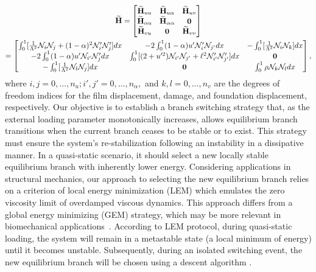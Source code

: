 \begin{multline}
    \widetilde{\mathbf{H}}=
    \begin{bmatrix}
        \widetilde{\mathbf{H}}_{uu}       & \widetilde{\mathbf{H}}_{u\alpha}      & \widetilde{\mathbf{H}}_{uv} \\
        \widetilde{\mathbf{H}}_{\alpha u} & \widetilde{\mathbf{H}}_{\alpha\alpha} & \textbf{0}          \\
        \widetilde{\mathbf{H}}_{vu}       & \textbf{0}                    & \widetilde{\mathbf{H}}_{vv}
    \end{bmatrix}
    \\=
    \begin{bmatrix}
        \int_0^1[ \frac{1}{\Lambda^2}{\mathcal N}_i{\mathcal N}_j + (1-\alpha)^2{\mathcal N}'_i{\mathcal N}'_j] dx         &
        -2\int_0^1(1-\alpha)u' {\mathcal N}'_i {\mathcal N}_{{j'}}  dx                                                     &
        -\int_0^1[\frac{1}{\Lambda^2}{\mathcal N}_i {\mathcal N}_{{k}}]  dx                                                                                                                     \\
        -2\int_0^1(1-\alpha)u' {\mathcal N}_{{i'}} {\mathcal N}'_j dx                                                      &
        \int_0^1 [ (2+u'^2){\mathcal N}_{{i'}}{\mathcal N}_{{j'}} +\ell^2{\mathcal N}'_{{i'}}{\mathcal N}'_{{j'}}] dx &
        \textbf{0}                                                                                                                                                                              \\
        -\int_0^1[\frac{1}{\Lambda^2}{\mathcal N}_{{l}}{\mathcal N}_j ] dx                                                 & \textbf{0} & \int_0^1 \rho {\mathcal N}_{{k}}{\mathcal N}_{{l}} dx
    \end{bmatrix},
    \label{eq:stifness2}
\end{multline}
{where $i, j = 0,\dots, n_u; i', j' = 0,\dots, n_\alpha, $ and $k, l = 0,\dots, n_v$ are the degrees of freedom indices for the film displacement, damage, and foundation displacement, respectively.}
Our objective is to establish a branch switching strategy that,
as the external loading parameter monotonically increases, allows equilibrium branch transitions when the current branch ceases to be stable or to exist.
This strategy must ensure the system's re-stabilization following an instability in a dissipative manner. In a quasi-static scenario, it should select a new locally stable equilibrium branch with inherently lower energy.  Considering applications in structural mechanics, our approach to selecting the new equilibrium branch relies on a criterion of local energy minimization (LEM) which emulates the zero viscosity limit of overdamped viscous dynamics. This approach differs from a global energy minimizing (GEM) strategy, which may be more relevant in biomechanical applications~\cite{Salman2021-mn}. According to LEM protocol, during quasi-static loading, the system will remain in a metastable state (a local minimum of energy) until it becomes unstable. Subsequently, during an isolated switching event, the new equilibrium branch will be chosen using a descent algorithm \cite{Puglisi2005-lg}.
